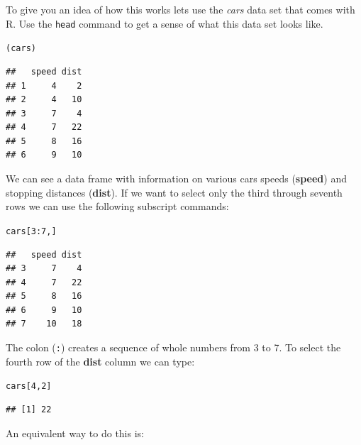 \documentclass[krantz1]{krantz}
\begin{document}
To give you an idea of how this works lets use the {\emph{cars}} data set that comes with R. Use the \texttt{head} command to get a sense of what this data set looks like.

\begin{knitrout}
\color{fgcolor}\begin{kframe}
\begin{alltt}
(cars)
\end{alltt}
\begin{verbatim}
##   speed dist
## 1     4    2
## 2     4   10
## 3     7    4
## 4     7   22
## 5     8   16
## 6     9   10
\end{verbatim}
\end{kframe}
\end{knitrout}


\noindent We can see a data frame with information on various cars speeds (\textbf{speed}) and stopping distances (\textbf{dist}). If we want to select only the third through seventh rows we can use the following subscript commands:

\begin{knitrout}
\color{fgcolor}\begin{kframe}
\begin{alltt}
cars[3:7, ]
\end{alltt}
\begin{verbatim}
##   speed dist
## 3     7    4
## 4     7   22
## 5     8   16
## 6     9   10
## 7    10   18
\end{verbatim}
\end{kframe}
\end{knitrout}


\noindent The colon (\texttt{:}) creates a sequence of whole numbers from 3 to 7. To select the fourth row of the \textbf{dist} column we can type:

\begin{knitrout}
\color{fgcolor}\begin{kframe}
\begin{alltt}
cars[4, 2]
\end{alltt}
\begin{verbatim}
## [1] 22
\end{verbatim}
\end{kframe}
\end{knitrout}


\noindent An equivalent way to do this is:
\end{document}
